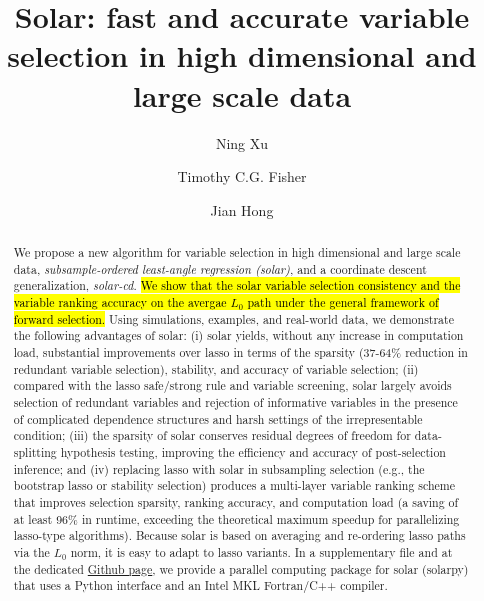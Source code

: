 \documentclass[11pt,review,authoryear]{elsarticle}
\begin{document}
\title{Solar: fast and accurate variable selection in high dimensional and large scale data}

\author{Ning Xu}
\address{School of Economics, University of Sydney, Australia}

\author{Timothy C.G. Fisher}
\address{School of Economics, University of Sydney, Australia}

\author{Jian Hong}
\address{School of Economics, University of Sydney, Australia}


\begin{abstract}
  We propose a new algorithm for variable selection in high dimensional and large scale data, \emph{subsample-ordered least-angle regression (solar)}, and a coordinate descent generalization, \emph{solar-cd}. \hl{We show that the solar variable selection consistency and the variable ranking accuracy on the avergae $L_0$ path under the general framework of forward selection.} Using simulations, examples, and real-world data, we demonstrate the following advantages of solar: (i) solar yields, without any increase in computation load, substantial improvements over lasso in terms of the sparsity (37-64\% reduction in redundant variable selection), stability, and accuracy of variable selection; (ii) compared with the lasso safe/strong rule and variable screening, solar largely avoids selection of redundant variables and rejection of informative variables in the presence of complicated dependence structures and harsh settings of the irrepresentable condition; (iii) the sparsity of solar conserves residual degrees of freedom for data-splitting hypothesis testing, improving the efficiency and accuracy of post-selection inference; and (iv) replacing lasso with solar in subsampling selection (e.g., the bootstrap lasso or stability selection) produces a multi-layer variable ranking scheme that improves selection sparsity, ranking accuracy, and computation load (a saving of at least 96\% in runtime, exceeding the theoretical maximum speedup for parallelizing lasso-type algorithms). Because solar is based on averaging and re-ordering lasso paths via the $L_0$ norm, it is easy to adapt to lasso variants. In a supplementary file and at the dedicated \href{https://github.com/isaac2math/solarpy}{Github page}, we provide a parallel computing package for solar (solarpy) that uses a Python interface and an Intel MKL Fortran/C++ compiler.
\end{abstract}
\end{document}
